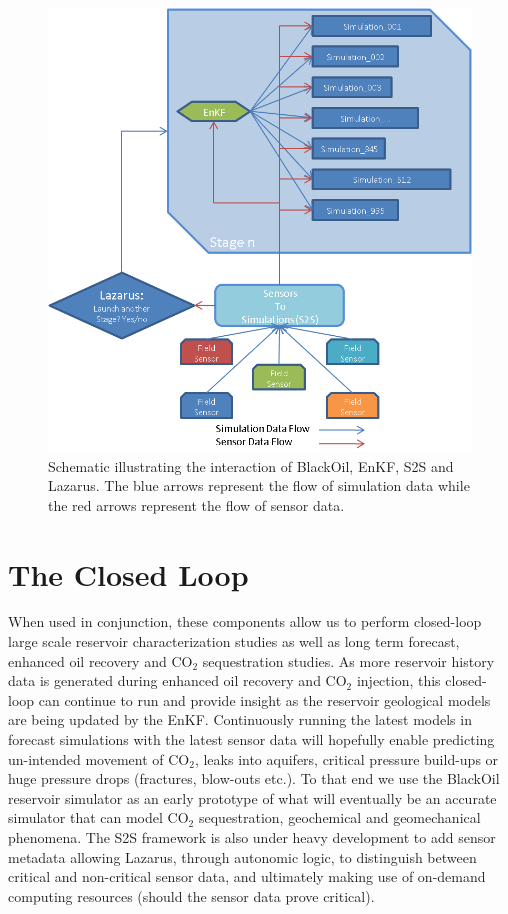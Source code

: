 \documentclass[10pt,conference,final]{IEEEtran}
\begin{document}
\begin{figure}
\begin{center}
\includegraphics*[scale=0.65,angle=0]{figures/Picture2.png}
\end{center}
\caption{Schematic illustrating the interaction of BlackOil, EnKF, S2S and Lazarus. The 
blue arrows represent the flow of 
simulation data while the red arrows represent the flow of sensor data.}
\label{fig:Data Flow}
\end{figure}

\section*{The Closed Loop}

When used in conjunction, these components allow us to perform closed-loop large scale reservoir characterization studies as well as long term forecast, enhanced oil recovery and CO$_2$ sequestration studies. As more reservoir history data is generated during enhanced oil recovery and CO$_2$ injection, this closed-loop can continue to run and provide insight as the reservoir geological models are being updated by the EnKF.  Continuously running the latest models in forecast simulations with the latest sensor data will hopefully enable predicting un-intended movement of CO$_2$, leaks into aquifers, critical pressure build-ups or huge pressure drops (fractures, blow-outs etc.). To that end we use the BlackOil reservoir simulator as an early prototype of what will eventually be an accurate simulator that can model CO$_2$ sequestration, geochemical and geomechanical phenomena. The S2S framework is also under heavy development to add sensor metadata allowing Lazarus, through autonomic logic, to distinguish between critical and non-critical sensor data, and ultimately making use of on-demand computing resources (should the sensor data prove critical).
\end{document}
